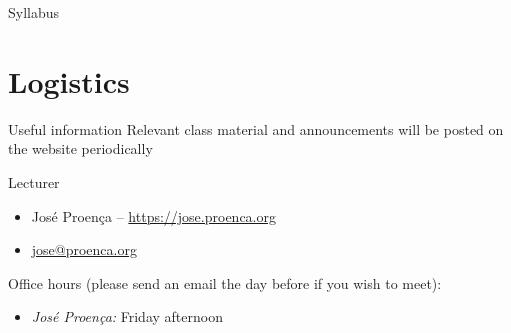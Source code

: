 \documentclass[aspectratio=169]{beamer}
\begin{document}
\begin{slide}{Syllabus}
\end{slide}


\section{Logistics}

\begin{frame}{Useful information}
  Relevant class material and announcements will be posted on the website periodically

  {\centering{}

  }

  \alert{Lecturer}
    \begin{itemize}
      \item José Proença -- \url{https://jose.proenca.org}
      \item \href{mailto:jose@proenca.org}{jose@proenca.org}
    \end{itemize}
           

  \alert{Office hours} (please send an email the day before if you wish to meet):
  \begin{itemize}
    \item \emph{José Proença:} Friday afternoon
  \end{itemize} 
\end{frame}
\end{document}
